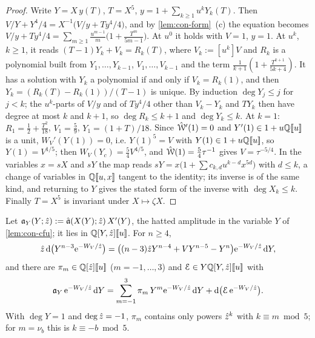 \begin{proof}
Write $Y=X\,y(T)$, $T=X^5$, $y=1+\sum_{k\geq1}u^kY_k(T)$. Then $V/Y+Y^4/4=X^{-1}\bigl(V/y+Ty^4/4\bigr)$, and by \cref{lem:con-form}~(c) the equation becomes $V/y+Ty^4/4=\sum_{m\geq1}\frac{u^{m-1}}m\bigl(1+\frac{T^m}{5m-1}\bigr)$. At $u^0$ it holds with $V=1$, $y=1$. At $u^k$, $k\geq1$, it reads $(T-1)Y_k+V_k=R_k(T)$, where $V_k:=[u^k]V$ and $R_k$ is a polynomial built from $Y_1,\dots,Y_{k-1}$, $V_1,\dots,V_{k-1}$ and the term $\frac1{k+1}(1+\frac{T^{k+1}}{5k+4})$. It has a solution with $Y_k$ a polynomial if and only if $V_k=R_k(1)$, and then $Y_k=(R_k(T)-R_k(1))/(T-1)$ is unique. By induction $\deg Y_j\leq j$ for $j<k$; the $u^k$-parts of $V/y$ and of $Ty^4/4$ other than $V_k-Y_k$ and $TY_k$ then have degree at most $k$ and $k+1$, so $\deg R_k\leq k+1$ and $\deg Y_k\leq k$. At $k=1$: $R_1=\frac12+\frac{T^2}{18}$, $V_1=\frac59$, $Y_1=(1+T)/18$. Since $\hat{\mathcal{W}}'(1)=0$ and $Y'(1)\in1+u\mathbb{Q}[\![ u ]\!]$ is a unit, $W_V'(Y(1))=0$, i.e. $Y(1)^5=V$ with $Y(1)\in1+u\mathbb{Q}[\![ u ]\!]$, so $Y(1)=V^{1/5}$; then $W_V(Y_c)=\frac54V^{4/5}$, and $\hat{\mathcal{W}}(1)=\frac54\tau^{-1}$ gives $V=\tau^{-5/4}$. In the variables $x=sX$ and $sY$ the map reads $sY=x\bigl(1+\sum c_{k,d}u^{k-d}x^{5d}\bigr)$ with $d\leq k$, a change of variables in $\mathbb{Q}[\![ u,x ]\!]$ tangent to the identity; its inverse is of the same kind, and returning to $Y$ gives the stated form of the inverse with $\deg X_k\leq k$. Finally $T=X^5$ is invariant under $X\mapsto\zeta X$.
\end{proof}

\begin{lem}
\label{lem:con-red}
Let $\mathfrak{a}_Y(Y;\hat{z}):=\hat{\mathfrak{a}}(X(Y);\hat{z})\,X'(Y)$, the hatted amplitude in the variable $Y$ of \cref{lem:con-cfu}; it lies in $\mathbb{Q}[Y,\hat{z}][\![ u ]\!]$. For $n\geq4$,
\[
\hat{z}\,\mathrm{d}\bigl(Y^{n-3}\mathrm{e}^{-W_V/\hat{z}}\bigr)=\bigl((n-3)\hat{z} Y^{n-4}+VY^{n-5}-Y^n\bigr)\mathrm{e}^{-W_V/\hat{z}}\,\mathrm{d} Y,
\]
and there are $\pi_m\in\mathbb{Q}[\hat{z}][\![ u ]\!]$ ($m=-1,\dots,3$) and $\mathcal E\in Y\mathbb{Q}[Y,\hat{z}][\![ u ]\!]$ with
\[
\mathfrak{a}_Y\,\mathrm{e}^{-W_V/\hat{z}}\,\mathrm{d} Y=\sum_{m=-1}^{3}\pi_m\,Y^m\mathrm{e}^{-W_V/\hat{z}}\,\mathrm{d} Y+\mathrm{d}\bigl(\mathcal E\,\mathrm{e}^{-W_V/\hat{z}}\bigr).
\]
With $\deg Y=1$ and $\deg\hat{z}=-1$, $\pi_m$ contains only powers $\hat{z}^k$ with $k\equiv m\bmod5$; for $m=\nu_b$ this is $k\equiv-b\bmod5$.
\end{lem}

